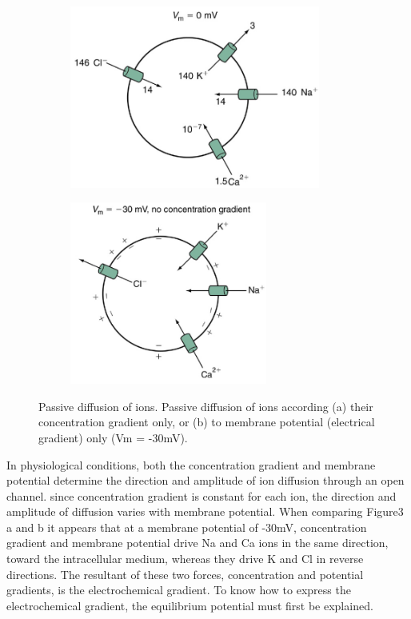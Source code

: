 \documentclass[../../Orator]{subfiles}
\begin{document}
\begin{figure}[H]
    \begin{subfigure}[t]{0.48\textwidth}
    \centering
      \caption{}
      \includegraphics[height=6cm]{Pictures/Anakin/c.grad.png}
    \end{subfigure}
    \begin{subfigure}[t]{0.48\textwidth}
    \centering
      \caption{}
      \includegraphics[height=6cm]{Pictures/Anakin/el.grad.png}
    \end{subfigure}
    
      \caption{Passive  diffusion  of  ions.  Passive  diffusion  of  ions  according  (a)  their  concentration  gradient  only,  or  (b)  to  membrane  potential (electrical gradient) only (Vm = -30mV).
}
      
      \label{} 
\end{figure}

In physiological conditions, both the concentration gradient and membrane potential determine the direction and amplitude of ion diffusion through an open channel. since concentration gradient is constant for each ion, the direction and amplitude of diffusion varies with membrane potential. When comparing Figure3 a and b it appears that at a membrane potential of -30mV, concentration gradient and membrane potential drive \gls{Na} and \gls{Ca} ions in the same direction, toward the intracellular medium, whereas they drive \gls{K} and \gls{Cl} in reverse directions. The resultant of these two forces, concentration and potential gradients, is the electrochemical gradient. To know how to express the electrochemical gradient, the equilibrium potential must first be explained.
\end{document}
